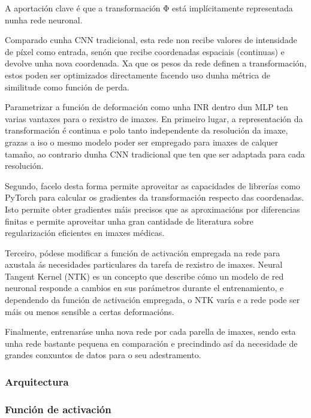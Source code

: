 A aportación clave é que a transformación Φ está implícitamente representada nunha rede neuronal.

Comparado cunha CNN tradicional, esta rede non recibe valores de intensidade de píxel como entrada,
 senón que recibe coordenadas espaciais (continuas) e devolve unha nova coordenada.
Xa que os pesos da rede definen a transformación, estos poden ser optimizados directamente 
facendo uso dunha métrica de similitude como función de perda.

Parametrizar a función de deformación como unha INR dentro dun MLP ten varias vantaxes para o rexistro de imaxes.
En primeiro lugar, a representación da transformación é continua e polo tanto independente da resolución da imaxe, 
grazas a iso o mesmo modelo poder ser empregado para imaxes de calquer tamaño, ao contrario dunha CNN tradicional 
que ten que ser adaptada para cada resolución.

Segundo, facelo desta forma permite aproveitar as capacidades de librerías como PyTorch para calcular os gradientes da transformación respecto das coordenadas.
Isto permite obter gradientes máis precisos que as aproximacións por diferencias finitas 
e permite aproveitar unha gran cantidade de literatura sobre regularización eficientes en imaxes médicas.

Terceiro, pódese modificar a función de activación empregada na rede para axustala ás necesidades particulares da tarefa de rexistro de imaxes.
Neural Tangent Kernel (NTK) es un concepto que describe cómo un modelo de red neuronal responde a cambios en sus parámetros durante el entrenamiento,
 e dependendo da función de activación empregada, o NTK varía e a rede pode ser máis ou menos sensible a certas deformacións.

 Finalmente, entrenaráse unha nova rede por cada parella de imaxes, sendo esta unha rede bastante pequena en comparación e precindindo así da necesidade de grandes conxuntos de datos para o seu adestramento.
 
\subsubsection{Arquitectura}
\label{subsubsec:Arquitectura}


\subsubsection{Función de activación}
\label{subsubsec:Función de activación}

